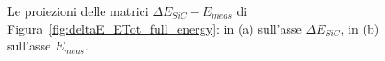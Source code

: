 \begin{figure} [!p]
	\centering

	\caption{Le proiezioni delle matrici $\Delta E_{SiC} - E_{meas}$ di Figura~\ref{fig:deltaE_ETot_full_energy}: in (a) sull'asse $\Delta E_{SiC}$, in (b) sull'asse $E_{meas}$.} \label{fig:fetta}
\end{figure}





